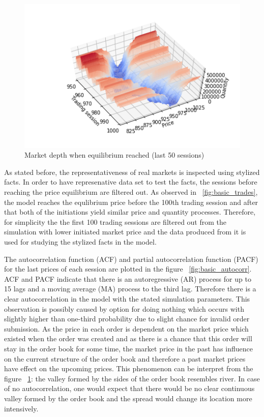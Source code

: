 \begin{figure}
    \includegraphics[width=\linewidth]{plots/basic_market_depth_in_equilibrium.png}
    \caption{Market depth when equilibrium reached (last 50 sessions)}
    \label{fig:basic_market_depth_equilibrium}
\end{figure}

As stated before, the representativeness of real markets is inspected using
stylized facts. In order to have represenative data set to test the facts, the
sessions before reaching the price equilibrium are filtered out. 
As observed in ~\ref{fig:basic_trades}, the model reaches the equlibrium 
price before the 100th trading session and after that both of the initiations 
yield similar price and quantity processes. Therefore, for simplicity the
the first 100 trading sessions are filtered out from the simulation with
lower initiated market price and the data produced from it is used for 
studying the stylized facts in the model.

The autocorrelation function (ACF) and partial autocorrelation function (PACF) for the last prices of
each session are plotted in the figure ~\ref{fig:basic_autocorr}. ACF and PACF indicate that there is 
an autoregressive (AR) process for up to 15 lags and a moving average (MA) process to the third lag. Therefore
there is a clear autocorrelation in the model with the stated simulation parameters. This
observation is possibly caused by option for doing nothing which occurs with slightly higher than
one-third probability due to slight chance for invalid order submission. As the price in each order
is dependent on the market price which existed when the order was created and as there is a chance that
this order will stay in the order book for some time, the market price in the past has influence on the
current structure of the order book and therefore a past market prices have effect on the upcoming prices.
This phenomenon can be interpret from the figure ~\ref{fig:basic_market_depth_equilibrium}: the valley
formed by the sides of the order book resembles river. In case of no autocorrelation, one would expect
that there would be no clear continuous valley formed by the order book and the spread would change
its location more intensively. 

